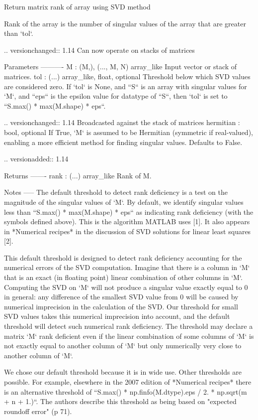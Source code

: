 \begin{DoxyVerb}Return matrix rank of array using SVD method

Rank of the array is the number of singular values of the array that are
greater than `tol`.

.. versionchanged:: 1.14
   Can now operate on stacks of matrices

Parameters
----------
M : {(M,), (..., M, N)} array_like
    Input vector or stack of matrices.
tol : (...) array_like, float, optional
    Threshold below which SVD values are considered zero. If `tol` is
    None, and ``S`` is an array with singular values for `M`, and
    ``eps`` is the epsilon value for datatype of ``S``, then `tol` is
    set to ``S.max() * max(M.shape) * eps``.

    .. versionchanged:: 1.14
       Broadcasted against the stack of matrices
hermitian : bool, optional
    If True, `M` is assumed to be Hermitian (symmetric if real-valued),
    enabling a more efficient method for finding singular values.
    Defaults to False.

    .. versionadded:: 1.14

Returns
-------
rank : (...) array_like
    Rank of M.

Notes
-----
The default threshold to detect rank deficiency is a test on the magnitude
of the singular values of `M`.  By default, we identify singular values less
than ``S.max() * max(M.shape) * eps`` as indicating rank deficiency (with
the symbols defined above). This is the algorithm MATLAB uses [1].  It also
appears in *Numerical recipes* in the discussion of SVD solutions for linear
least squares [2].

This default threshold is designed to detect rank deficiency accounting for
the numerical errors of the SVD computation.  Imagine that there is a column
in `M` that is an exact (in floating point) linear combination of other
columns in `M`. Computing the SVD on `M` will not produce a singular value
exactly equal to 0 in general: any difference of the smallest SVD value from
0 will be caused by numerical imprecision in the calculation of the SVD.
Our threshold for small SVD values takes this numerical imprecision into
account, and the default threshold will detect such numerical rank
deficiency.  The threshold may declare a matrix `M` rank deficient even if
the linear combination of some columns of `M` is not exactly equal to
another column of `M` but only numerically very close to another column of
`M`.

We chose our default threshold because it is in wide use.  Other thresholds
are possible.  For example, elsewhere in the 2007 edition of *Numerical
recipes* there is an alternative threshold of ``S.max() *
np.finfo(M.dtype).eps / 2. * np.sqrt(m + n + 1.)``. The authors describe
this threshold as being based on "expected roundoff error" (p 71).


\end{DoxyVerb}
